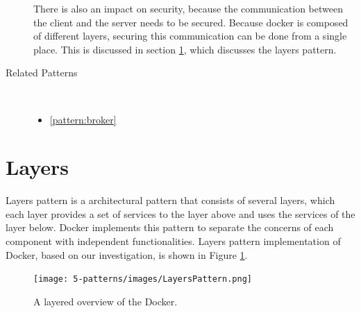 \begin{description}
There is also an impact on security, because the communication between the client and the server needs to be secured. Because docker is composed of different layers, securing this communication can be done from a single place. This is discussed in section \ref{sec:layers-pattern}, which discusses the layers pattern.

\item [Related Patterns]~
\begin{itemize}
\item \ref{pattern:broker}
\end{itemize}

\end{description}

\section{Layers}
\label{sec:layers-pattern}
Layers pattern is a architectural pattern that consists of several layers, which
each layer provides a set of services to the layer above and uses the services
of the layer below. Docker implements this pattern to separate the concerns of
each component with independent functionalities. Layers pattern implementation
of Docker, based on our investigation, is shown in Figure \ref{fig:layers-pattern}.

\begin{figure}[H]
\centering
\texttt{[image: 5-patterns/images/LayersPattern.png]}
\caption{A layered overview of the Docker.}
\label{fig:layers-pattern}
\end{figure}

